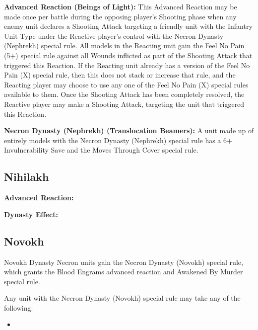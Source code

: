 \textbf{Advanced Reaction (Beings of Light):} This Advanced Reaction may be made once per battle during the opposing player’s Shooting phase when any enemy unit declares a Shooting Attack targeting a friendly unit with the Infantry Unit Type under the Reactive player’s control with the Necron Dynasty (Nephrekh) special rule. All models in the Reacting unit gain the Feel No Pain (5+) special rule against all Wounds inflicted as part of the Shooting Attack that triggered this Reaction. If the Reacting unit already has a version of the Feel No Pain (X) special rule, then this does not stack or increase that rule, and the Reacting player may choose to use any one of the Feel No Pain (X) special rules available to them. Once the Shooting Attack has been completely resolved, the Reactive player may make a Shooting Attack, targeting the unit that triggered this Reaction.

\textbf{Necron Dynasty (Nephrekh) (Translocation Beamers):} A unit made up of entirely models with the Necron Dynasty (Nephrekh) special rule has a 6+ Invulnerability Save and the Moves Through Cover special rule. 


\subsection{Nihilakh}

\textbf{Advanced Reaction:}

\textbf{Dynasty Effect:}


\subsection{Novokh}

Novokh Dynasty Necron units gain the Necron Dynasty (Novokh) special rule, which grants the Blood Engrams advanced reaction and Awakened By Murder special rule.

Any unit with the Necron Dynasty (Novokh) special rule may take any of the following:
\begin{itemize}
	\item %
\end{itemize}

